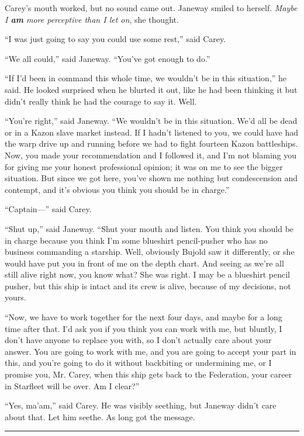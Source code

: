 \documentclass[twoside,letterpaper,12pt]{memoir}
\begin{document}
Carey's mouth worked, but no sound came out. Janeway smiled to herself. \textit{Maybe I \textbf{am} more perceptive than I let on}, she thought. 

``I was just going to say you could use some rest,'' said Carey. 

``We all could,'' said Janeway. ``You've got enough to do.'' 

``If I'd been in command this whole time, we wouldn't be in this situation,'' he said. He looked surprised when he blurted it out, like he had been thinking it but didn't really think he had the courage to say it. Well. 

``You're right,'' said Janeway. ``We wouldn't be in this situation. We'd all be dead or in a Kazon slave market instead. If I hadn't listened to you, we could have had the warp drive up and running before we had to fight fourteen Kazon battleships. Now, you made your recommendation and I followed it, and I'm not blaming you for giving me your honest professional opinion; it was on me to see the bigger situation. But since we got here, you've shown me nothing but condescension and contempt, and it's obvious you think you should be in charge.'' 

``Captain---'' said Carey. 

``Shut up,'' said Janeway. ``Shut your mouth and listen. You think you should be in charge because you think I'm some blueshirt pencil-pusher who has no business commanding a starship. Well, obviously Bujold saw it differently, or she would have put you in front of me on the depth chart. And seeing as we're all still alive right now, you know what? She was right. I may be a blueshirt pencil pusher, but this ship is intact and its crew is alive, because of my decisions, not yours. 

``Now, we have to work together for the next four days, and maybe for a long time after that. I'd ask you if you think you can work with me, but bluntly, I don't have anyone to replace you with, so I don't actually care about your answer. You are going to work with me, and you are going to accept your part in this, and you're going to do it without backbiting or undermining me, or I promise you, Mr. Carey, when this ship gets back to the Federation, your career in Starfleet will be over. Am I clear?'' 

``Yes, ma'am,'' said Carey. He was visibly seething, but Janeway didn't care about that. Let him seethe. As long got the message.

\fancybreak{\rule{3cm}{0.4 pt}} 
\end{document}
